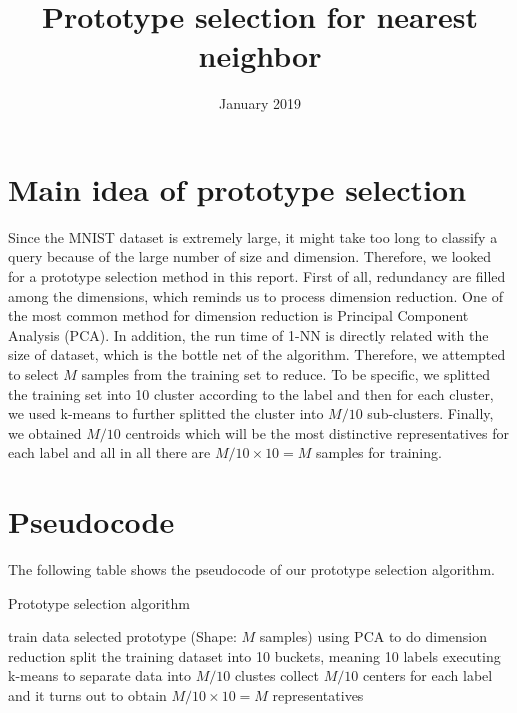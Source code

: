 \documentclass{article}
\title{Prototype selection for nearest neighbor}
\date{January 2019}
\begin{document}
\maketitle

\section{Main idea of prototype selection}
Since the MNIST dataset is extremely large, it might take too long to classify a query because of the large number of size and dimension. Therefore, we looked for a prototype selection method in this report. First of all, redundancy are filled among the dimensions, which reminds us to process dimension reduction. One of the most common method for dimension reduction is Principal Component Analysis (PCA). In addition, the run time of 1-NN is directly related with the size of dataset, which is the bottle net of the algorithm. Therefore, we attempted to select $M$ samples from the training set to reduce. To be specific, we splitted the training set into 10 cluster according to the label and then for each cluster, we used k-means to further splitted the cluster into $M/10$ sub-clusters. Finally, we obtained $M/10$ centroids which will be the most distinctive representatives for each label and all in all there are $M/10\times 10=M$ samples for training.
\section{Pseudocode}
The following table shows the pseudocode of our prototype selection algorithm.
\begin{algorithm}
        \caption{Prototype selection algorithm}
        \begin{algorithmic}[1]
            \Require train data
            \Ensure selected prototype (Shape: $M$ samples)
             \State using PCA to do dimension reduction
             \State split the training dataset into 10 buckets, meaning 10 labels
             \State executing k-means to separate data into $M/10$ clustes
             \State collect $M/10$ centers for each label and it turns out to obtain $M/10\times 10=M$ representatives
        \end{algorithmic}
\end{algorithm}
\end{document}
